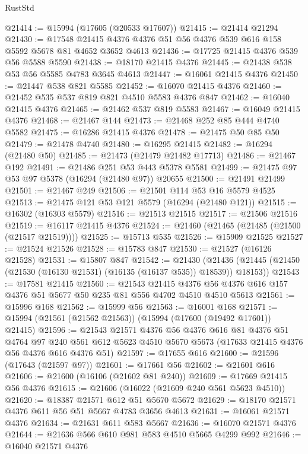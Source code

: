 \begin{lexlean}{RustStd}
\begin{coremodule}
@21414 := @15994 (@17605 (@20533 @17607))
@21415 := @21414 @21294
@21430 := @17548 @21415 @4376 @4376 @51 @56 @4376 @539 @616 @158 @5592 @5678 @81 @4652 @3652 @4613
@21436 := @17725 @21415 @4376 @539 @56 @5588 @5590
@21438 := @18170 @21415 @4376
@21445 := @21438 @538 @53 @56 @5585 @4783 @3645 @4613
@21447 := @16061 @21415 @4376
@21450 := @21447 @538 @821 @5585
@21452 := @16070 @21415 @4376
@21460 := @21452 @535 @537 @819 @821 @4510 @5583 @4376 @847
@21462 := @16040 @21415 @4376
@21465 := @21462 @537 @819 @5583
@21467 := @16049 @21415 @4376
@21468 := @21467 @144
@21473 := @21468 @252 @85 @444 @4740 @5582
@21475 := @16286 @21415 @4376
@21478 := @21475 @50 @85 @50
@21479 := @21478 @4740
@21480 := @16295 @21415
@21482 := @16294 (@21480 @50)
@21485 := @21473 (@21479 @21482 @17713)
@21486 := @21467 @192
@21491 := @21486 @251 @53 @443 @5378 @5581
@21499 := @21475 @97 @53 @97 @5378 (@16294 (@21480 @97)) @20655
@21500 := @21491 @21499
@21501 := @21467 @249
@21506 := @21501 @114 @53 @16 @5579 @4525
@21513 := @21475 @121 @53 @121 @5579 (@16294 (@21480 @121))
@21515 := @16302 (@16303 @5579)
@21516 := @21513 @21515
@21517 := @21506 @21516
@21519 := @16117 @21415 @4376
@21524 := @21460 (@21465 (@21485 (@21500 (@21517 @21519))))
@21525 := @15713 @535
@21526 := @15909 @21525
@21527 := @21524 @21526
@21528 := @15783 @847
@21530 := @21527 (@16126 @21528)
@21531 := @15807 @847
@21542 := @21430
    (@21436 (@21445 (@21450 (@21530 (@16130 @21531) (@16135 (@16137 @535)) @18539)) @18153))
@21543 := @17581 @21415
@21560 := @21543
    @21415
    @4376
    @56
    @4376
    @616
    @157
    @4376
    @51
    @5677
    @50
    @235
    @81
    @556
    @4702
    @4510
    @4510
    @5613
@21561 := @15996 @168
@21562 := @15999 @56
@21563 := @16001 @168
@21571 := @15994 (@21561 (@21562 @21563)) (@15994 (@17600 (@19492 @17601)) @21415)
@21596 := @21543
    @21571
    @4376
    @56
    @4376
    @616
    @81
    @4376
    @51
    @4764
    @97
    @240
    @561
    @612
    @5623
    @4510
    @5670
    @5673
    (@17633 @21415 @4376 @56 @4376 @616 @4376 @51)
@21597 := @17655 @616
@21600 := @21596 (@17643 (@21597 @97))
@21601 := @17661 @56
@21602 := @21601 @616
@21606 := @21600 (@16106 (@21602 @81 @240))
@21609 := @17669 @21415 @56 @4376
@21615 := @21606 (@16022 (@21609 @240 @561 @5623 @4510))
@21620 := @18387 @21571 @612 @51 @5670 @5672
@21629 := @18170 @21571 @4376 @611 @56 @51 @5667 @4783 @3656 @4613
@21631 := @16061 @21571 @4376
@21634 := @21631 @611 @583 @5667
@21636 := @16070 @21571 @4376
@21644 := @21636 @566 @610 @981 @583 @4510 @5665 @4299 @992
@21646 := @16040 @21571 @4376

\end{coremodule}
\end{lexlean}
